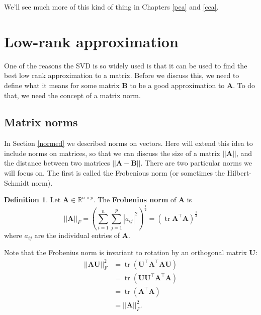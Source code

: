\documentclass[]{book}
\theoremstyle{definition}
\newtheorem{definition}{Definition}[chapter]
\theoremstyle{definition}
\theoremstyle{definition}
\theoremstyle{remark}
\begin{document}
We'll see much more of this kind of thing in Chapters \ref{pca} and \ref{cca}.

\hypertarget{low-rank-approximation}{%
\section{Low-rank approximation}\label{low-rank-approximation}}

One of the reasons the SVD is so widely used is that it can be used to find the best low rank approximation to a matrix. Before we discuss this, we need to define what it means for some matrix \(\boldsymbol B\) to be a good approximation to \(\boldsymbol A\). To do that, we need the concept of a matrix norm.

\hypertarget{matrix-norms}{%
\subsection{Matrix norms}\label{matrix-norms}}

In Section \ref{normed} we described norms on vectors. Here will extend this idea to include norms on matrices, so that we can discuss the size of a matrix \(||\boldsymbol A||\), and the distance between two matrices \(||\boldsymbol A-\boldsymbol B||\). There are two particular norms we will focus on. The first is called the Frobenious norm (or sometimes the Hilbert-Schmidt norm).

\begin{definition}
\protect\hypertarget{def:frobenius}{}{\label{def:frobenius} }Let \(\boldsymbol A\in \mathbb{R}^{n\times p}\). The \textbf{Frobenius norm} of \(\boldsymbol A\) is
\[||\boldsymbol A||_F = \left(\sum_{i=1}^n\sum_{j=1}^p |a_{ij}|^2\right)^{\frac{1}{2}}=(\operatorname{tr}\boldsymbol A^\top\boldsymbol A)^{\frac{1}{2}}  
\]
where \(a_{ij}\) are the individual entries of \(\boldsymbol A\).
\end{definition}

Note that the Frobenius norm is invariant to rotation by an orthogonal matrix \(\boldsymbol U\):
\begin{align*}
 ||\boldsymbol A\boldsymbol U||_F^2 &= \operatorname{tr}(\boldsymbol U^\top \boldsymbol A^\top \boldsymbol A\boldsymbol U)\\
 &=\operatorname{tr}(\boldsymbol U\boldsymbol U^\top \boldsymbol A^\top \boldsymbol A)\\
 &= \operatorname{tr}(\boldsymbol A^\top\boldsymbol A)\\
 &= ||\boldsymbol A||_F^2.
\end{align*}
\end{document}
